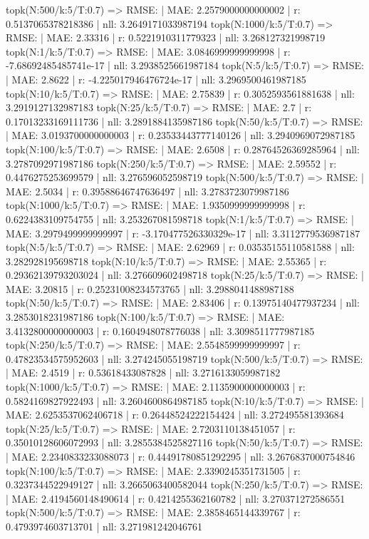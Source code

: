 topk(N:500/k:5/T:0.7) => RMSE: | MAE: 2.2579000000000002 | r: 0.5137065378218386 | nll: 3.2649171033987194
topk(N:1000/k:5/T:0.7) => RMSE: | MAE: 2.33316 | r: 0.5221910311779323 | nll: 3.268127321998719
topk(N:1/k:5/T:0.7) => RMSE: | MAE: 3.0846999999999998 | r: -7.68692485485741e-17 | nll: 3.2938525661987184
topk(N:5/k:5/T:0.7) => RMSE: | MAE: 2.8622 | r: -4.225017946476724e-17 | nll: 3.2969500461987185
topk(N:10/k:5/T:0.7) => RMSE: | MAE: 2.75839 | r: 0.3052593561881638 | nll: 3.2919127132987183
topk(N:25/k:5/T:0.7) => RMSE: | MAE: 2.7 | r: 0.17013233169111736 | nll: 3.2891884135987186
topk(N:50/k:5/T:0.7) => RMSE: | MAE: 3.0193700000000003 | r: 0.23533443777140126 | nll: 3.2940969072987185
topk(N:100/k:5/T:0.7) => RMSE: | MAE: 2.6508 | r: 0.28764526369285964 | nll: 3.2787092971987186
topk(N:250/k:5/T:0.7) => RMSE: | MAE: 2.59552 | r: 0.4476275253699579 | nll: 3.276596052598719
topk(N:500/k:5/T:0.7) => RMSE: | MAE: 2.5034 | r: 0.39588646747636497 | nll: 3.2783723079987186
topk(N:1000/k:5/T:0.7) => RMSE: | MAE: 1.9350999999999998 | r: 0.6224383109754755 | nll: 3.253267081598718
topk(N:1/k:5/T:0.7) => RMSE: | MAE: 3.2979499999999997 | r: -3.170477526330329e-17 | nll: 3.3112779536987187
topk(N:5/k:5/T:0.7) => RMSE: | MAE: 2.62969 | r: 0.03535155110581588 | nll: 3.282928195698718
topk(N:10/k:5/T:0.7) => RMSE: | MAE: 2.55365 | r: 0.29362139793203024 | nll: 3.276609602498718
topk(N:25/k:5/T:0.7) => RMSE: | MAE: 3.20815 | r: 0.25231008234573765 | nll: 3.2988041488987188
topk(N:50/k:5/T:0.7) => RMSE: | MAE: 2.83406 | r: 0.13975140477937234 | nll: 3.2853018231987186
topk(N:100/k:5/T:0.7) => RMSE: | MAE: 3.4132800000000003 | r: 0.1604948078776038 | nll: 3.3098511777987185
topk(N:250/k:5/T:0.7) => RMSE: | MAE: 2.5548599999999997 | r: 0.47823534575952603 | nll: 3.274245055198719
topk(N:500/k:5/T:0.7) => RMSE: | MAE: 2.4519 | r: 0.53618433087828 | nll: 3.2716133059987182
topk(N:1000/k:5/T:0.7) => RMSE: | MAE: 2.1135900000000003 | r: 0.5824169827922493 | nll: 3.2604600864987185
topk(N:10/k:5/T:0.7) => RMSE: | MAE: 2.6253537062406718 | r: 0.26448524222154424 | nll: 3.272495581393684
topk(N:25/k:5/T:0.7) => RMSE: | MAE: 2.7203110138451057 | r: 0.35010128606072993 | nll: 3.2855384525827116
topk(N:50/k:5/T:0.7) => RMSE: | MAE: 2.2340833233088073 | r: 0.44491780851292295 | nll: 3.2676837000754846
topk(N:100/k:5/T:0.7) => RMSE: | MAE: 2.3390245351731505 | r: 0.3237344522949127 | nll: 3.2665063400582044
topk(N:250/k:5/T:0.7) => RMSE: | MAE: 2.4194560148490614 | r: 0.4214255362160782 | nll: 3.270371272586551
topk(N:500/k:5/T:0.7) => RMSE: | MAE: 2.3858465144339767 | r: 0.4793974603713701 | nll: 3.271981242046761
